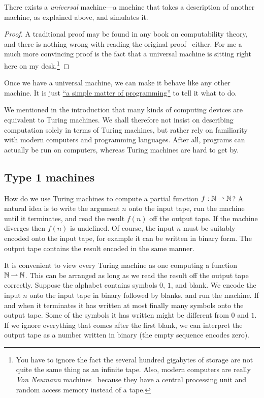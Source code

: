 \begin{theorem}[Turing]
  \label{thm:universal-machine}
  There exists a \emph{universal} machine---a machine that takes a
  description of another machine, as explained above, and simulates
  it.
\end{theorem}

\begin{proof}
  A traditional proof may be found in any book on computability
  theory, and there is nothing wrong with reading the original
  proof~\cite{turing37:_comput_number_with_applic_to_entsc} either.
  For me a much more convincing proof is the fact that a universal
  machine is sitting right here on my desk.\footnote{You have to
    ignore the fact the several hundred gigabytes of storage are not
    quite the same thing as an infinite tape. Also, modern computers
    are really \emph{Von Neumann}
    machines~\cite{goldstein47:_repor_mathem_and_logic_aspec} because
    they have a central processing unit and random access memory
    instead of a tape.}
\end{proof}

Once we have a universal machine, we can make it behave like any other
machine. It is just
\href{http://www.catb.org/jargon/html/S/SMOP.html}{``a simple matter
  of programming''} to tell it what to do.

We mentioned in the introduction that many kinds of computing devices
are equivalent to Turing machines. We shall therefore not insist on
describing computation solely in terms of Turing machines, but rather
rely on familiarity with modern computers and programming languages.
After all, programs can actually be run on computers, whereas Turing
machines are hard to get by.


\subsection{Type 1 machines}
\label{sec:type-1}

How do we use Turing machines to compute a partial function $f :
\mathbb{N} \mathbin{\rightharpoonup} \mathbb{N}$? A natural idea is to write the argument $n$ onto the
input tape, run the machine until it terminates, and read the result
$f(n)$ off the output tape. If the machine diverges then $f(n)$ is
undefined. Of course, the input $n$ must be suitably encoded onto the
input tape, for example it can be written in binary form. The output
tape contains the result encoded in the same manner.

It is convenient to view every Turing machine as one computing a
function $\mathbb{N} \mathbin{\rightharpoonup} \mathbb{N}$. This can be arranged as long as we read the
result off the output tape correctly. Suppose the alphabet contains
symbols $0$, $1$, and blank. We encode the input $n$ onto the input
tape in binary followed by blanks, and run the machine. If and when it
terminates it has written at most finally many symbols onto the output
tape. Some of the symbols it has written might be different from $0$
and $1$. If we ignore everything that comes after the first blank, we
can interpret the output tape as a number written in binary (the empty
sequence encodes zero).

